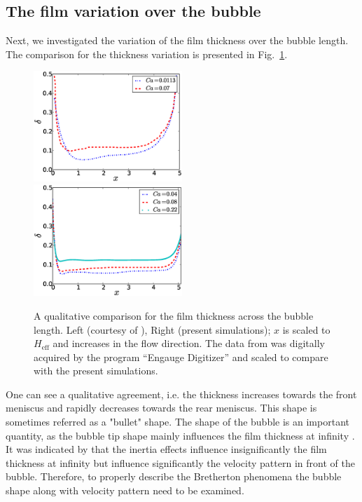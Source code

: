\documentclass[preprint,12pt]{elsarticle}
\begin{document}
\subsection{The film variation over the bubble}
\label{section:film:thickness:variation}
Next, we investigated the variation of the film thickness over the bubble length.
The comparison for the thickness variation is presented in Fig.~\ref{fig:sehgal:bubble:length}.
\begin{figure}
\includegraphics[width=0.5\textwidth]{Figures/Bubble/bubble_sehgal_new.eps}\hfill
\includegraphics[width=0.5\textwidth]{Figures/Bubble/bubble_length_new.eps}\\
\caption{A qualitative comparison for the film thickness across
the bubble length. {\color{red} Left} (courtesy of \citet{sehgal-microchannel}),
{\color{red} Right}  (present simulations); $x$ is scaled to $H_{\mathrm{eff}}$
and increases in the flow direction.{\color{red} The data from
\cite{sehgal-microchannel} was digitally acquired by the program ``Engauge Digitizer'' and scaled
to compare with the present simulations.} \label{fig:sehgal:bubble:length}}
\end{figure}
One can see a qualitative agreement, i.e. the thickness increases towards the front meniscus and
rapidly decreases towards the rear meniscus. This shape is sometimes referred as a "bullet"
shape.
{\color{red} The shape of the bubble is an important quantity, as the bubble tip shape mainly
influences the film thickness at infinity \cite{bretherton}. It was indicated by
\citet{heil-bretherton} that the inertia effects influence insignificantly the film thickness at
infinity but influence significantly the velocity pattern in front of the bubble. Therefore, to
properly describe the Bretherton phenomena the
bubble shape along with velocity pattern need to be examined.}
\end{document}
